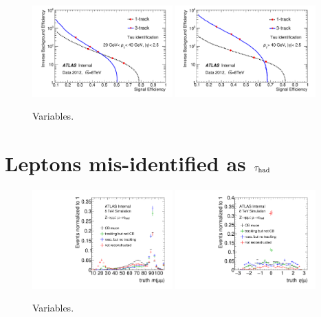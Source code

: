 \begin{figure}[tp]
  \centering
  \includegraphics[width=0.48\textwidth]{figures/PERF-2013-06_tmp/roc_lowpt}
  \includegraphics[width=0.48\textwidth]{figures/PERF-2013-06_tmp/roc_highpt}
  \caption{Variables.}
  \label{fig:taus-idroc}
\end{figure}

\section{Leptons mis-identified as $\tau_\text{had}$}
\label{sec:taus-leptonfakes}

\begin{figure}[tp]
  \centering
  \includegraphics[width=0.48\textwidth]{figures/tauperformance/muonfakes_mll}
  \includegraphics[width=0.48\textwidth]{figures/tauperformance/muonfakes_eta}
  \caption{Variables.}
  \label{fig:taus-muonfakes1}
\end{figure}

